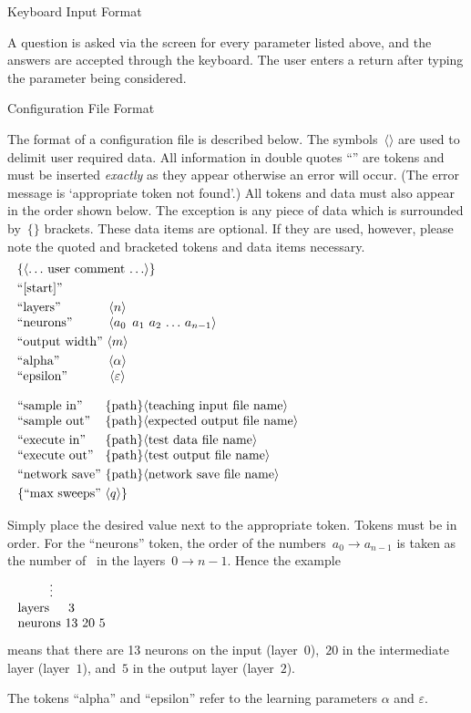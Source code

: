 \sssec Keyboard Input Format

A question is asked via the screen for every parameter listed above,
and the answers are accepted through the keyboard.
The user enters a return after typing the parameter being
considered.

\sssec Configuration File Format

The format of a configuration file is described below.
The symbols~$\langle\rangle$ are used to delimit user required data.
All information in double quotes ``'' are tokens and must be
inserted {\sl exactly} as they appear otherwise an error will occur.
(The error message is `appropriate token not found'.)
All tokens and data must also appear in the order shown below.
The exception is any piece of data which is surrounded
by~$\{\}$ brackets.
These data items are optional.
If they are used, however, please note the quoted and bracketed
tokens and data items necessary.
$$\vbox{
\halign{#\hfil&&\ \hfil#\hfil\cr
	\noalign{\noindent$\{\langle \ldots$ user comment $\ldots \rangle\}$}
	\noalign{\smallskip}
	``[start]''\cr
	\noalign{\smallskip}
	``layers''&$\langle n\rangle$\cr
	``neurons''&$\langle a_0$&$a_1$&$a_2$&$\ldots$&$a_{n-1}\rangle$\cr
	\noalign{\smallskip}
	``output width''&$\langle m\rangle$\cr
	\noalign{\smallskip}
	``alpha''&$\langle\alpha\rangle$\cr
	``epsilon''&$\langle\varepsilon\rangle$\cr
}}
$$
$$\vbox{
\halign{#\hfil&\ #\hfil\cr
	\noalign{$\quad$}
	``sample in''&$\{$path$\}\langle$teaching input file name$\rangle$\cr
	``sample out''&$\{$path$\}\langle$expected output file name$\rangle$\cr
	\noalign{\smallskip}
	``execute in''&$\{$path$\}\langle$test data file name$\rangle$\cr
	``execute out''&$\{$path$\}\langle$test output file name$\rangle$\cr
	\noalign{\smallskip}
	``network save''&$\{$path$\}\langle$network save file name$\rangle$\cr
	\noalign{\smallskip}
	$\{$``max sweeps''&$\langle q\rangle\}$\cr
}}
$$

Simply place the desired value next to the appropriate token.
Tokens must be in order.
For the ``neurons'' token, the order of the numbers~$a_0\to a_{n-1}$ is 
taken as the number of \neus\ in the layers~$0\to n-1$.
Hence the example
$$\vbox{
\halign{#\hfil&&\ \hfil#\hfil\cr
	\noalign{$\quad\vdots$}
	layers&$3$\cr
	\neus &$13$&$20$&$5$\cr
}}
$$
means that there are 13 neurons on the input (layer~$0$),~$20$ in
the intermediate layer (layer~$1$), and~$5$ in the output layer
(layer~$2$).

The tokens ``alpha'' and ``epsilon'' refer to the learning
parameters $\alpha$ and $\varepsilon$.

